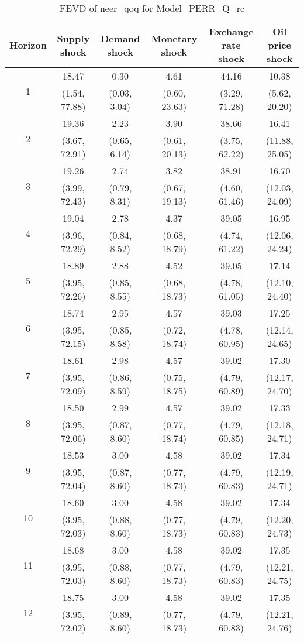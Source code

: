 \documentclass{article}
\begin{document}
\begin{table}
	\footnotesize
	\caption{FEVD of neer_qoq for Model_PERR_Q_rc}
	\begin{tabular}{cccccc}
		Horizon & Supply shock & Demand shock & Monetary shock & Exchange rate shock & Oil price shock\\ \hline
		\multirow{2}{*}{1} & 18.47 & 0.30 & 4.61 & 44.16 & 10.38\\
		 & (1.54, 77.88) & (0.03, 3.04) & (0.60, 23.63) & (3.29, 71.28) & (5.62, 20.20)\\
		\multirow{2}{*}{2} & 19.36 & 2.23 & 3.90 & 38.66 & 16.41\\
		 & (3.67, 72.91) & (0.65, 6.14) & (0.61, 20.13) & (3.75, 62.22) & (11.88, 25.05)\\
		\multirow{2}{*}{3} & 19.26 & 2.74 & 3.82 & 38.91 & 16.70\\
		 & (3.99, 72.43) & (0.79, 8.31) & (0.67, 19.13) & (4.60, 61.46) & (12.03, 24.09)\\
		\multirow{2}{*}{4} & 19.04 & 2.78 & 4.37 & 39.05 & 16.95\\
		 & (3.96, 72.29) & (0.84, 8.52) & (0.68, 18.79) & (4.74, 61.22) & (12.06, 24.24)\\
		\multirow{2}{*}{5} & 18.89 & 2.88 & 4.52 & 39.05 & 17.14\\
		 & (3.95, 72.26) & (0.85, 8.55) & (0.68, 18.73) & (4.78, 61.05) & (12.10, 24.40)\\
		\multirow{2}{*}{6} & 18.74 & 2.95 & 4.57 & 39.03 & 17.25\\
		 & (3.95, 72.15) & (0.85, 8.58) & (0.72, 18.74) & (4.78, 60.95) & (12.14, 24.65)\\
		\multirow{2}{*}{7} & 18.61 & 2.98 & 4.57 & 39.02 & 17.30\\
		 & (3.95, 72.09) & (0.86, 8.59) & (0.75, 18.75) & (4.79, 60.89) & (12.17, 24.70)\\
		\multirow{2}{*}{8} & 18.50 & 2.99 & 4.57 & 39.02 & 17.33\\
		 & (3.95, 72.06) & (0.87, 8.60) & (0.77, 18.74) & (4.79, 60.85) & (12.18, 24.71)\\
		\multirow{2}{*}{9} & 18.53 & 3.00 & 4.58 & 39.02 & 17.34\\
		 & (3.95, 72.04) & (0.87, 8.60) & (0.77, 18.73) & (4.79, 60.83) & (12.19, 24.71)\\
		\multirow{2}{*}{10} & 18.60 & 3.00 & 4.58 & 39.02 & 17.34\\
		 & (3.95, 72.03) & (0.88, 8.60) & (0.77, 18.73) & (4.79, 60.83) & (12.20, 24.73)\\
		\multirow{2}{*}{11} & 18.68 & 3.00 & 4.58 & 39.02 & 17.35\\
		 & (3.95, 72.03) & (0.88, 8.60) & (0.77, 18.73) & (4.79, 60.83) & (12.21, 24.75)\\
		\multirow{2}{*}{12} & 18.75 & 3.00 & 4.58 & 39.02 & 17.35\\
		 & (3.95, 72.02) & (0.89, 8.60) & (0.77, 18.73) & (4.79, 60.83) & (12.21, 24.76)\\
	\end{tabular}
\label{tab:fevd-Model_PERR_Q_rc-neer_qoq}
\end{table}
\end{document}
